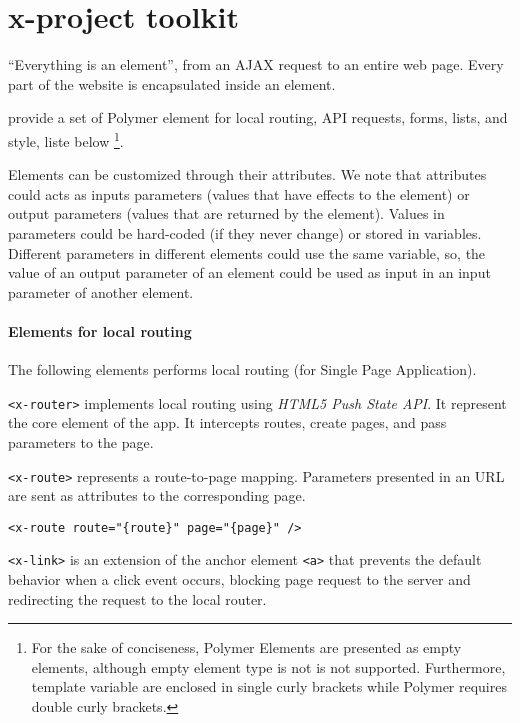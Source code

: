 \section{x-project toolkit}\label{sec:toolkit}

``Everything is an element'', from an AJAX request to an entire web page. Every part of the website is encapsulated inside an element. 

 provide a set of Polymer element for local routing, API requests, forms, lists, and style, liste below \footnote{\scriptsize For the sake of conciseness, Polymer Elements are presented as empty elements, although empty element type is not is not supported. Furthermore, template variable are enclosed in single curly brackets while Polymer requires double curly brackets.}. 

Elements can be customized through their attributes. We note that attributes could acts as inputs parameters (values that have effects to the element) or output parameters (values that are returned by the element).
Values in parameters could be hard-coded (if they never change) or stored in variables.
Different parameters in different elements could use the same variable, so, the value of an output parameter of an element could be used as input in an input parameter of another element.

\paragraph{Elements for local routing}

The following elements performs local routing (for Single Page Application).

\vspace{0.2cm}

\texttt{<x-router>} implements local routing using \emph{HTML5 Push State API}. It represent the core element of the app. It intercepts routes, create pages, and pass parameters to the page.

\vspace{0.2cm}

\texttt{<x-route>} represents a route-to-page mapping. 
Parameters presented in an URL are sent as attributes to the corresponding page.

\begin{lstlisting}[language=HTML5]
<x-route route="{route}" page="{page}" />
\end{lstlisting}

\texttt{<x-link>} is an extension of the anchor element \texttt{<a>} that prevents the default behavior when a click event occurs, blocking page request to the server and redirecting the request to the local router. 

